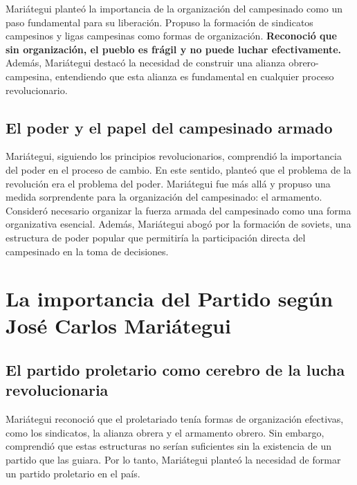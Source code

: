 \documentclass[
  a4paper,
]{article}
\begin{document}
Mariátegui planteó la importancia de la organización del campesinado
como un paso fundamental para su liberación. Propuso la formación de
sindicatos campesinos y ligas campesinas como formas de organización.
\textbf{Reconoció que sin organización, el pueblo es frágil y no puede
luchar efectivamente.} Además, Mariátegui destacó la necesidad de
construir una alianza obrero-campesina, entendiendo que esta alianza es
fundamental en cualquier proceso revolucionario.

\hypertarget{el-poder-y-el-papel-del-campesinado-armado}{%
\subsection{El poder y el papel del campesinado
armado}\label{el-poder-y-el-papel-del-campesinado-armado}}

Mariátegui, siguiendo los principios revolucionarios, comprendió la
importancia del poder en el proceso de cambio. En este sentido, planteó
que el problema de la revolución era el problema del poder. Mariátegui
fue más allá y propuso una medida sorprendente para la organización del
campesinado: el armamento. Consideró necesario organizar la fuerza
armada del campesinado como una forma organizativa esencial. Además,
Mariátegui abogó por la formación de soviets, una estructura de poder
popular que permitiría la participación directa del campesinado en la
toma de decisiones.

\hypertarget{la-importancia-del-partido-seguxfan-josuxe9-carlos-mariuxe1tegui}{%
\section{La importancia del Partido según José Carlos
Mariátegui}\label{la-importancia-del-partido-seguxfan-josuxe9-carlos-mariuxe1tegui}}

\hypertarget{el-partido-proletario-como-cerebro-de-la-lucha-revolucionaria}{%
\subsection{El partido proletario como cerebro de la lucha
revolucionaria}\label{el-partido-proletario-como-cerebro-de-la-lucha-revolucionaria}}

Mariátegui reconoció que el proletariado tenía formas de organización
efectivas, como los sindicatos, la alianza obrera y el armamento obrero.
Sin embargo, comprendió que estas estructuras no serían suficientes sin
la existencia de un partido que las guiara. Por lo tanto, Mariátegui
planteó la necesidad de formar un partido proletario en el país.
\end{document}
